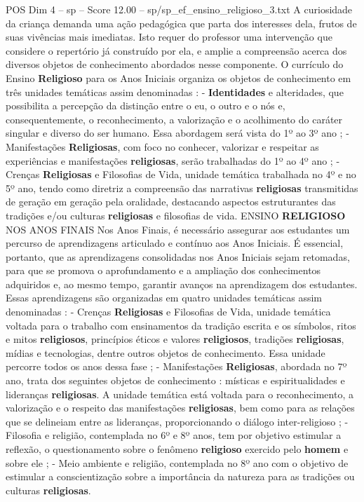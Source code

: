 \begin{textsample}{POS Dim 4 – sp – Score 12.00 – sp/sp\_ef\_ensino\_religioso\_3.txt}
A curiosidade da criança demanda uma ação pedagógica que parta dos interesses dela, frutos de suas vivências mais imediatas.
Isto requer do professor uma intervenção que considere o repertório já construído por ela, e amplie a compreensão acerca dos diversos objetos de conhecimento abordados nesse componente.
O currículo do Ensino \textbf{Religioso} para os Anos Iniciais organiza os objetos de conhecimento em três unidades temáticas assim denominadas : - \textbf{Identidades} e alteridades, que possibilita a percepção da distinção entre o eu, o outro e o nós e, consequentemente, o reconhecimento, a valorização e o acolhimento do caráter singular e diverso do ser humano.
Essa abordagem será vista do 1º ao 3º ano ; - Manifestações \textbf{Religiosas}, com foco no conhecer, valorizar e respeitar as experiências e manifestações \textbf{religiosas}, serão trabalhadas do 1º ao 4º ano ; - Crenças \textbf{Religiosas} e Filosofias de Vida, unidade temática trabalhada no 4º e no 5º ano, tendo como diretriz a compreensão das narrativas \textbf{religiosas} transmitidas de geração em geração pela oralidade, destacando aspectos estruturantes das tradições e/ou culturas \textbf{religiosas} e filosofias de vida.
ENSINO \textbf{RELIGIOSO} NOS ANOS FINAIS Nos Anos Finais, é necessário assegurar aos estudantes um percurso de aprendizagens articulado e contínuo aos Anos Iniciais.
É essencial, portanto, que as aprendizagens consolidadas nos Anos Iniciais sejam retomadas, para que se promova o aprofundamento e a ampliação dos conhecimentos adquiridos e, ao mesmo tempo, garantir avanços na aprendizagem dos estudantes.
Essas aprendizagens são organizadas em quatro unidades temáticas assim denominadas : - Crenças \textbf{Religiosas} e Filosofias de Vida, unidade temática voltada para o trabalho com ensinamentos da tradição escrita e os símbolos, ritos e mitos \textbf{religiosos}, princípios éticos e valores \textbf{religiosos}, tradições \textbf{religiosas}, mídias e tecnologias, dentre outros objetos de conhecimento.
Essa unidade percorre todos os anos dessa fase ; - Manifestações \textbf{Religiosas}, abordada no 7º ano, trata dos seguintes objetos de conhecimento : místicas e espiritualidades e lideranças \textbf{religiosas}.
A unidade temática está voltada para o reconhecimento, a valorização e o respeito das manifestações \textbf{religiosas}, bem como para as relações que se delineiam entre as lideranças, proporcionando o diálogo inter-religioso ; - Filosofia e religião, contemplada no 6º e 8º anos, tem por objetivo estimular a reflexão, o questionamento sobre o fenômeno \textbf{religioso} exercido pelo \textbf{homem} e sobre ele ; - Meio ambiente e religião, contemplada no 8º ano com o objetivo de estimular a conscientização sobre a importância da natureza para as tradições ou culturas \textbf{religiosas}.

\end{textsample}
